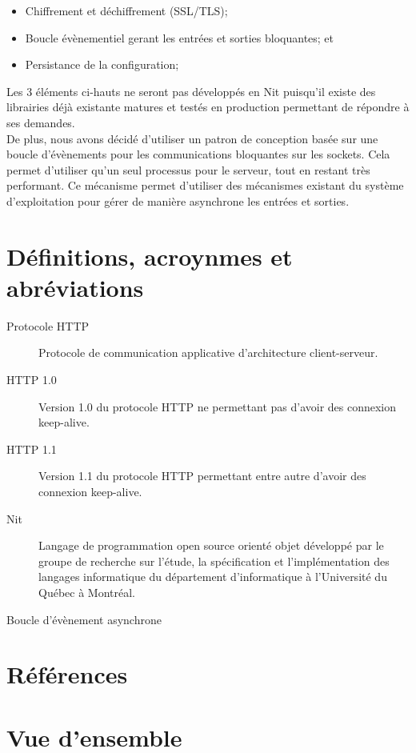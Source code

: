 \documentclass{scrreprt}
\begin{document}
\begin{itemize}
    \item Chiffrement et déchiffrement (SSL/TLS);
    \item Boucle évènementiel gerant les entrées et sorties bloquantes; et
    \item Persistance de la configuration;
\end{itemize}

Les 3 éléments ci-hauts ne seront pas développés en Nit puisqu'il existe des
librairies déjà existante matures et testés en production permettant de répondre
à ses demandes.
\\
De plus, nous avons décidé d'utiliser un patron de conception basée sur
une boucle d'évènements pour les communications bloquantes sur les sockets. Cela
permet d'utiliser qu'un seul processus pour le serveur, tout en restant très performant.
Ce mécanisme permet d'utiliser des mécanismes existant du système d'exploitation pour
gérer de manière asynchrone les entrées et sorties\cite{c10k}.

\section{Définitions, acroynmes et abréviations}
\begin{description}
    \item[Protocole HTTP] Protocole de communication applicative d'architecture client-serveur\cite{http}.
    \item[HTTP 1.0] Version 1.0 du protocole HTTP ne permettant pas d'avoir des connexion keep-alive.
    \item[HTTP 1.1] Version 1.1 du protocole HTTP permettant entre autre d'avoir des connexion keep-alive\cite{http1.0}.
    \item[Nit] Langage de programmation open source orienté objet développé par le groupe de recherche sur l'étude, la spécification et l'implémentation des langages informatique du département d'informatique à l'Université du Québec à Montréal.
    \item[Boucle d'évènement asynchrone] 
\end{description}

\section{Références}
\section{Vue d'ensemble}
\end{document}
